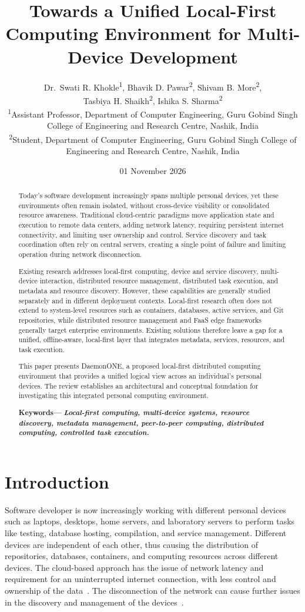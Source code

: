 \documentclass[10pt,twocolumn]{article}
\title{Towards a Unified Local-First Computing Environment for Multi-Device Development}
\author{%
	\begin{minipage}{0.92\textwidth}
		\centering
		Dr.\ Swati R. Khokle\textsuperscript{1}, Bhavik D. Pawar\textsuperscript{2}, Shivam B. More\textsuperscript{2},\\ Tasbiya H. Shaikh\textsuperscript{2},
		Ishika S. Sharma\textsuperscript{2}\\[0.6em]
		\small
		\textsuperscript{1}Assistant Professor, Department of Computer Engineering,
		Guru Gobind Singh College of Engineering and Research Centre, Nashik, India\\[0.3em]
		\textsuperscript{2}Student, Department of Computer Engineering,
		Guru Gobind Singh College of Engineering and Research Centre, Nashik, India
	\end{minipage}
}
\date{01 November 2026}
\begin{document}
\twocolumn[\maketitle]
\begin{abstract}
  Today's software development increasingly spans multiple personal devices, yet these environments often remain isolated, without cross-device visibility or consolidated resource awareness. Traditional cloud-centric paradigms move application state and execution to remote data centers, adding network latency, requiring persistent internet connectivity, and limiting user ownership and control. Service discovery and task coordination often rely on central servers, creating a single point of failure and limiting operation during network disconnection. 
  
  Existing research addresses local-first computing, device and service discovery, multi-device interaction, distributed resource management, distributed task execution, and metadata and resource discovery. However, these capabilities are generally studied separately and in different deployment contexts. Local-first research often does not extend to system-level resources such as containers, databases, active services, and Git repositories, while distributed resource management and FaaS edge frameworks generally target enterprise environments. Existing solutions therefore leave a gap for a unified, offline-aware, local-first layer that integrates metadata, services, resources, and task execution. 
  
  This paper presents DaemonONE, a proposed local-first distributed computing environment that provides a unified logical view across an individual's personal devices. The review establishes an architectural and conceptual foundation for investigating this integrated personal computing environment.
  \par\smallskip
  \noindent\textbf{Keywords---} \textit{\textbf{Local-first computing, multi-device systems, resource discovery, metadata management, peer-to-peer computing, distributed computing, controlled task execution.}}
\end{abstract}

\section{Introduction}\label{sec:introduction}
Software developer is now increasingly working with different personal devices such as laptops, desktops, home servers, and laboratory servers to perform tasks like testing, database hosting, compilation, and service management. Different devices are independent of each other, thus causing the distribution of repositories, databases, containers, and computing resources across different devices. The cloud-based approach has the issue of network latency and requirement for an uninterrupted internet connection, with less control and ownership of the data~\cite{ref2,ref21}. The disconnection of the network can cause further issues in the discovery and management of the devices~\cite{ref6,ref7}.
\end{document}
